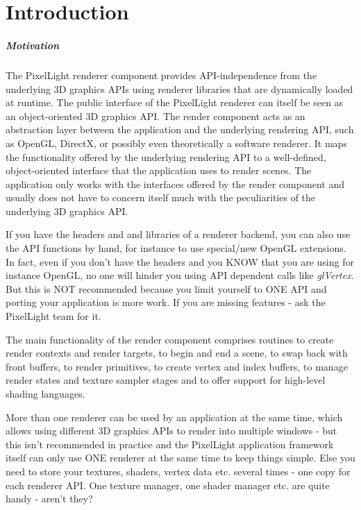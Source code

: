 \chapter{Introduction}


\paragraph{Motivation}
The PixelLight renderer component provides API-independence from the underlying 3D graphics APIs using renderer libraries that are dynamically loaded at runtime. The public interface of the PixelLight renderer can itself be seen as an object-oriented 3D graphics API. The render component acts as an abstraction layer between the application and the underlying rendering API, such as OpenGL, DirectX, or possibly even theoretically a software renderer. It maps the functionality offered by the underlying rendering API to a well-defined, object-oriented interface that the application uses to render scenes. The application only works with the interfaces offered by the render component and usually does not have to concern itself much with the peculiarities of the underlying 3D graphics API.

If you have the headers and and libraries of a renderer backend, you can also use the API functions by hand, for instance to use special/new OpenGL extensions. In fact, even if you don't have the headers and you KNOW that you are using for instance OpenGL, no one will hinder you using API dependent calls like \emph{glVertex}. But this is NOT recommended because you limit yourself to ONE API and porting your application is more work. If you are missing features - ask the PixelLight team for it.

The main functionality of the render component comprises routines to create render contexts and render targets, to begin and end a scene, to swap back with front buffers, to render primitives, to create vertex and index buffers, to manage render states and texture sampler stages and to offer support for high-level shading languages.

More than one renderer can be used by an application at the same time, which allows using different 3D graphics APIs to render into multiple windows - but this isn't recommended in practice and the PixelLight application framework itself can only use ONE renderer at the same time to keep things simple. Else you need to store your textures, shaders, vertex data etc. several times - one copy for each renderer API. One texture manager, one shader manager etc. are quite handy - aren't they?

